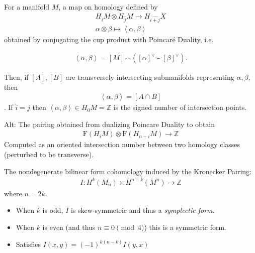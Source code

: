 \begin{definition}

For a manifold \(M\), a map on homology defined by
\begin{align*}
H_{\widehat{i}}M \otimes H_{\widehat{j}}M \to H_{\widehat{i+j}}X\\
\alpha\otimes\beta \mapsto \left< \alpha, \beta \right>
\end{align*}
obtained by conjugating the cup product with Poincaré Duality, i.e.~

\begin{align*}\left< \alpha, \beta \right> = [M] \frown ([\alpha]^\vee\smile [\beta]^\vee)
.\end{align*}

Then, if \([A], [B]\) are transversely intersecting submanifolds
representing \(\alpha, \beta\), then
\begin{align*}\left<\alpha, \beta\right> = [A\cap B]\end{align*}
. If \(\widehat{i} = j\) then
\(\left< \alpha, \beta \right> \in H_{0} M = {\mathbb{Z}}\) is the
signed number of intersection points.

Alt: The pairing obtained from dualizing Poincare Duality to obtain
\begin{align*}\mathrm{F}(H_{i} M) \otimes\mathrm{F}(H_{n-i}M) \to {\mathbb{Z}}\end{align*}
Computed as an oriented intersection number between two homology classes
(perturbed to be transverse).

\end{definition}

\begin{definition}

\end{definition}


\begin{definition}

The nondegenerate bilinear form cohomology induced by the Kronecker
Pairing:
\begin{align*}I: H^k(M_{n}) \times H^{n-k}(M^n) \to {\mathbb{Z}}\end{align*}
where \(n=2k\).

\begin{itemize}
\tightlist
\item
  When \(k\) is odd, \(I\) is skew-symmetric and thus a \emph{symplectic
  form.}
\item
  When \(k\) is even (and thus \(n \equiv 0 \pmod 4\)) this is a
  symmetric form.
\item
  Satisfies \(I(x,y) = (-1)^{k(n-k)} I(y, x)\)
\end{itemize}

\end{definition}

